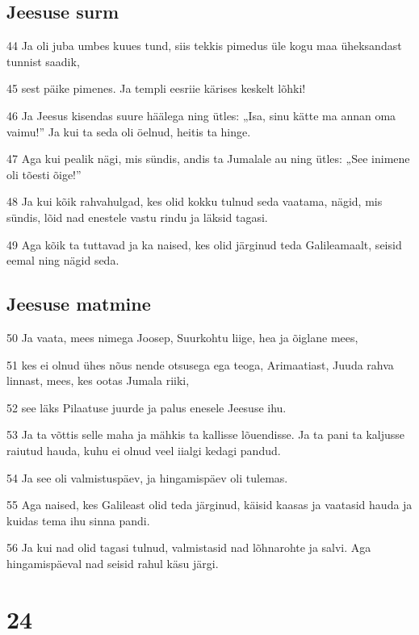 \section*{Jeesuse surm}

\par 44 Ja oli juba umbes kuues tund, siis tekkis pimedus üle kogu maa üheksandast tunnist saadik,
\par 45 sest päike pimenes. Ja templi eesriie kärises keskelt lõhki!
\par 46 Ja Jeesus kisendas suure häälega ning ütles: „Isa, sinu kätte ma annan oma vaimu!” Ja kui ta seda oli öelnud, heitis ta hinge.
\par 47 Aga kui pealik nägi, mis sündis, andis ta Jumalale au ning ütles: „See inimene oli tõesti õige!”
\par 48 Ja kui kõik rahvahulgad, kes olid kokku tulnud seda vaatama, nägid, mis sündis, lõid nad enestele vastu rindu ja läksid tagasi.
\par 49 Aga kõik ta tuttavad ja ka naised, kes olid järginud teda Galileamaalt, seisid eemal ning nägid seda.

\section*{Jeesuse matmine}

\par 50 Ja vaata, mees nimega Joosep, Suurkohtu liige, hea ja õiglane mees,
\par 51 kes ei olnud ühes nõus nende otsusega ega teoga, Arimaatiast, Juuda rahva linnast, mees, kes ootas Jumala riiki,
\par 52 see läks Pilaatuse juurde ja palus enesele Jeesuse ihu.
\par 53 Ja ta võttis selle maha ja mähkis ta kallisse lõuendisse. Ja ta pani ta kaljusse raiutud hauda, kuhu ei olnud veel iialgi kedagi pandud.
\par 54 Ja see oli valmistuspäev, ja hingamispäev oli tulemas.
\par 55 Aga naised, kes Galileast olid teda järginud, käisid kaasas ja vaatasid hauda ja kuidas tema ihu sinna pandi.
\par 56 Ja kui nad olid tagasi tulnud, valmistasid nad lõhnarohte ja salvi. Aga hingamispäeval nad seisid rahul käsu järgi.


\chapter{24}

